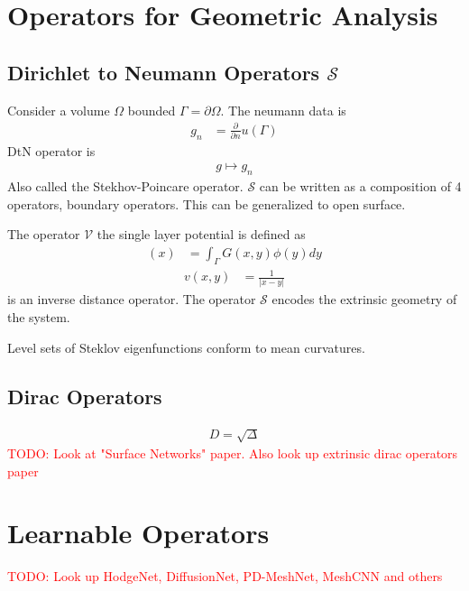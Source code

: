 \documentclass[book.tex]{subfiles}
\begin{document}
\section{Operators for Geometric Analysis}
\subsection{Dirichlet to Neumann Operators $\mathcal{S}$}

Consider a volume $\Omega$ bounded $\Gamma = \partial \Omega$. The neumann data is 
\begin{align}
    g_n &= \frac{\partial}{\partial n} u(\Gamma)
\end{align}
DtN operator is
\begin{align}
    g \mapsto g_n
\end{align}
Also called the Stekhov-Poincare operator. $\mathcal{S}$ can be written as a composition of 4 operators, boundary operators. This can be generalized to open surface.

The operator $\mathcal{V}$ the single layer potential is defined as
\begin{align}
    [V\phi](x) &= \int_\Gamma G(x, y) \phi(y) dy
\end{align}
\begin{align}
    v(x, y) &= \frac{1}{|x-y|}
\end{align}
is an inverse distance operator. The operator $\mathcal{S}$ encodes the extrinsic geometry of the system.

Level sets of Steklov eigenfunctions conform to mean curvatures.

\subsection{Dirac Operators}

\begin{align}
    D = \sqrt{\Delta}
\end{align}
\textcolor{red}{TODO: Look at "Surface Networks" paper. Also look up extrinsic dirac operators paper}

\section{Learnable Operators}

\textcolor{red}{TODO: Look up HodgeNet, DiffusionNet, PD-MeshNet, MeshCNN and others}
\end{document}
